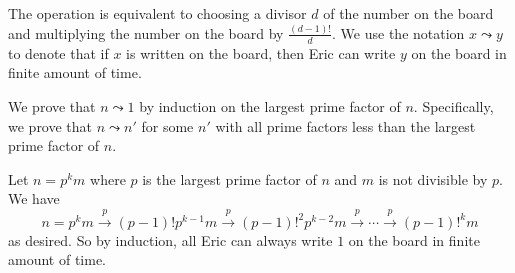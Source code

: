 The operation is equivalent to choosing a divisor $d$ of the number on the board and multiplying the number on the board by $\frac{(d-1)!}{d}$. We use the notation $x\leadsto y$ to denote that if $x$ is written on the board, then Eric can write $y$ on the board in finite amount of time.

We prove that $n\leadsto1$ by induction on the largest prime factor of $n$. Specifically, we prove that $n\leadsto n'$ for some $n'$ with all prime factors less than the largest prime factor of $n$.

Let $n=p^km$ where $p$ is the largest prime factor of $n$ and $m$ is not divisible by $p$. We have
\[
	n=p^km\stackrel{p}{\longrightarrow}(p-1)!p^{k-1}m\stackrel{p}{\longrightarrow}(p-1)!^2p^{k-2}m\stackrel{p}{\longrightarrow}\cdots\stackrel{p}{\longrightarrow}(p-1)!^km
\]
as desired. So by induction, all Eric can always write $1$ on the board in finite amount of time.